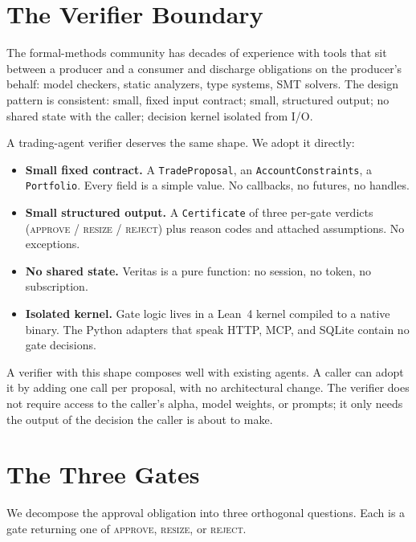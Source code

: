 \documentclass[11pt, a4paper]{article}
\begin{document}
\section{The Verifier Boundary}
\label{sec:boundary}

The formal-methods community has decades of experience with tools that sit
between a producer and a consumer and discharge obligations on the
producer's behalf: model checkers, static analyzers, type systems, SMT
solvers. The design pattern is consistent: small, fixed input contract;
small, structured output; no shared state with the caller; decision kernel
isolated from I/O.

A trading-agent verifier deserves the same shape. We adopt it directly:

\begin{itemize}[leftmargin=1.5em, itemsep=2pt, topsep=2pt]
\item \textbf{Small fixed contract.} A \texttt{TradeProposal}, an
      \texttt{AccountConstraints}, a \texttt{Portfolio}. Every field is a
      simple value. No callbacks, no futures, no handles.
\item \textbf{Small structured output.} A \texttt{Certificate} of three
      per-gate verdicts (\textsc{approve} / \textsc{resize} /
      \textsc{reject}) plus reason codes and attached assumptions. No
      exceptions.
\item \textbf{No shared state.} Veritas is a pure function: no session,
      no token, no subscription.
\item \textbf{Isolated kernel.} Gate logic lives in a Lean~4 kernel
      compiled to a native binary. The Python adapters that speak HTTP,
      MCP, and SQLite contain no gate decisions.
\end{itemize}

A verifier with this shape composes well with existing agents. A caller
can adopt it by adding one call per proposal, with no architectural
change. The verifier does not require access to the caller's alpha, model
weights, or prompts; it only needs the output of the decision the caller
is about to make.

\section{The Three Gates}
\label{sec:gates}

We decompose the approval obligation into three orthogonal questions.
Each is a gate returning one of \textsc{approve}, \textsc{resize}, or
\textsc{reject}.
\end{document}
